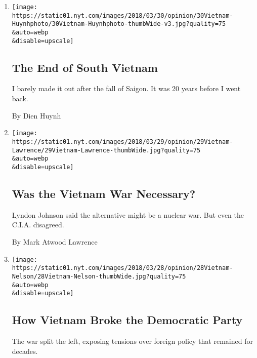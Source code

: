 \begin{enumerate}
\def\labelenumi{\arabic{enumi}.}
\item
  \href{/2018/03/30/opinion/the-end-of-south-vietnam.html}{}

  \texttt{[image: https://static01.nyt.com/images/2018/03/30/opinion/30Vietnam-Huynhphoto/30Vietnam-Huynhphoto-thumbWide-v3.jpg?quality=75\\\&auto=webp\\\&disable=upscale]}

  \hypertarget{the-end-of-south-vietnam}{%
  \subsection{The End of South Vietnam}\label{the-end-of-south-vietnam}}

  I barely made it out after the fall of Saigon. It was 20 years before
  I went back.

  By Dien Huynh
\item
  \href{/2018/03/29/opinion/vietnam-war-necessary.html}{}

  \texttt{[image: https://static01.nyt.com/images/2018/03/29/opinion/29Vietnam-Lawrence/29Vietnam-Lawrence-thumbWide.jpg?quality=75\\\&auto=webp\\\&disable=upscale]}

  \hypertarget{was-the-vietnam-war-necessary}{%
  \subsection{Was the Vietnam War
  Necessary?}\label{was-the-vietnam-war-necessary}}

  Lyndon Johnson said the alternative might be a nuclear war. But even
  the C.I.A. disagreed.

  By Mark Atwood Lawrence
\item
  \href{/2018/03/28/opinion/vietnam-broke-democratic-party.html}{}

  \texttt{[image: https://static01.nyt.com/images/2018/03/28/opinion/28Vietnam-Nelson/28Vietnam-Nelson-thumbWide.jpg?quality=75\\\&auto=webp\\\&disable=upscale]}

  \hypertarget{how-vietnam-broke-the-democratic-party}{%
  \subsection{How Vietnam Broke the Democratic
  Party}\label{how-vietnam-broke-the-democratic-party}}

  The war split the left, exposing tensions over foreign policy that
  remained for decades.


\end{enumerate}
